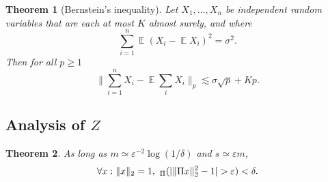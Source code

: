 \documentclass[11pt]{article}
\DeclareMathOperator*{\E}{\mathbb{E}}
\let\Pr\relax
\DeclareMathOperator*{\Pr}{\mathbb{P}}
\newcommand{\eps}{\varepsilon}
\newtheorem{theorem}{Theorem}
\begin{document}
\begin{theorem}[Bernstein's inequality]\label{bernstein}
Let $X_1,\ldots,X_n$ be independent random variables that are each at most $K$ almost surely, and where
$$
\sum_{i=1}^n \E(X_i - \E X_i)^2 = \sigma^2 .
$$
Then for all $p\ge 1$
$$
\|\sum_{i=1}^n X_i - \E\sum_i X_i\|_p \lesssim \sigma\sqrt{p} + Kp .
$$
\end{theorem}





















\subsection{Analysis of $Z$}

\begin{theorem}
As long as $m \simeq \eps^{-2}\log(1/\delta)$ and $s\simeq \eps m$,
\begin{equation}
\forall x : \|x\|_2 = 1,\ \Pr_{\Pi}(| \|\Pi x\|_2^2 - 1 | > \eps) < \delta .
\end{equation}
\end{theorem}
\end{document}
